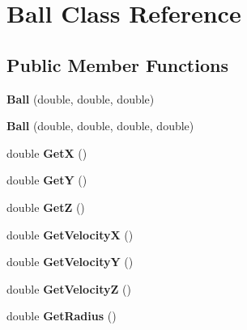\hypertarget{classBall}{\section{Ball Class Reference}
\label{classBall}
}
\subsection*{Public Member Functions}
\begin{DoxyCompactItemize}
\item 
\hypertarget{classBall_a24c86c12194059668dd6414cadf4bc9f}{{\bfseries Ball} (double, double, double)}\label{classBall_a24c86c12194059668dd6414cadf4bc9f}

\item 
\hypertarget{classBall_ac0194e2f3b841756b7237e0d9c22967f}{{\bfseries Ball} (double, double, double, double)}\label{classBall_ac0194e2f3b841756b7237e0d9c22967f}

\item 
\hypertarget{classBall_ad24c7dfa22e546da923858a01d676565}{double {\bfseries Get\+X} ()}\label{classBall_ad24c7dfa22e546da923858a01d676565}

\item 
\hypertarget{classBall_a22cf86bf47aa58969cb7f2409fa15713}{double {\bfseries Get\+Y} ()}\label{classBall_a22cf86bf47aa58969cb7f2409fa15713}

\item 
\hypertarget{classBall_afaa79e47006c9bbcb9adc612a2851ee7}{double {\bfseries Get\+Z} ()}\label{classBall_afaa79e47006c9bbcb9adc612a2851ee7}

\item 
\hypertarget{classBall_a5c91c38f628dccee0fd3010d792f32f0}{double {\bfseries Get\+Velocity\+X} ()}\label{classBall_a5c91c38f628dccee0fd3010d792f32f0}

\item 
\hypertarget{classBall_adc7030f9f566eed0bec433ff059471d3}{double {\bfseries Get\+Velocity\+Y} ()}\label{classBall_adc7030f9f566eed0bec433ff059471d3}

\item 
\hypertarget{classBall_a500ef8f18153571f859f9fec64320ae0}{double {\bfseries Get\+Velocity\+Z} ()}\label{classBall_a500ef8f18153571f859f9fec64320ae0}

\item 
\hypertarget{classBall_a51717a85f2d8e073aed1d0a3765b9705}{double {\bfseries Get\+Radius} ()}\label{classBall_a51717a85f2d8e073aed1d0a3765b9705}


\end{DoxyCompactItemize}
